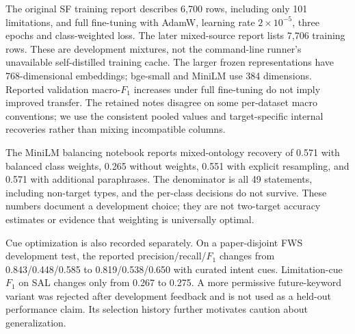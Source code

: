 The original SF training report describes 6,700 rows, including only 101 limitations, and
full fine-tuning with AdamW, learning rate $2\times10^{-5}$, three epochs and class-weighted
loss. The later mixed-source report lists 7,706 training rows. These are development mixtures,
not the command-line runner's unavailable self-distilled training cache. The larger frozen
representations have 768-dimensional embeddings; bge-small and MiniLM use 384 dimensions.
Reported validation macro-$F_1$ increases under full fine-tuning do not imply improved transfer.
The retained notes disagree on some per-dataset macro conventions; we use the consistent pooled
values and target-specific internal recoveries rather than mixing incompatible columns.

The MiniLM balancing notebook reports mixed-ontology recovery of 0.571 with balanced class
weights, 0.265 without weights, 0.551 with explicit resampling, and 0.571 with additional
paraphrases. The denominator is all 49 statements, including non-target types, and the
per-class decisions do not survive. These numbers document a development choice; they are
not two-target accuracy estimates or evidence that weighting is universally optimal.

Cue optimization is also recorded separately. On a paper-disjoint FWS development test, the
reported precision/recall/$F_1$ changes from 0.843/0.448/0.585 to 0.819/0.538/0.650 with curated
intent cues. Limitation-cue $F_1$ on SAL changes only from 0.267 to 0.275. A more permissive
future-keyword variant was rejected after development feedback and is not used as a held-out
performance claim. Its selection history further motivates caution about generalization.

